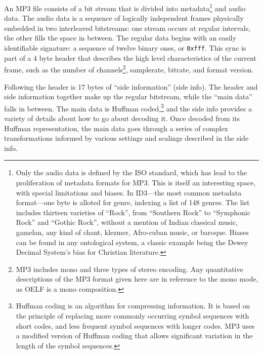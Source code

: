 \documentclass{thesis}
\begin{document}
	An MP3 file consists of a bit stream that is divided into metadata\footnote{Only the audio data is defined by the ISO standard, which has lead to the proliferation of metadata formats for MP3. This is itself an interesting space, with special limitations and biases. In ID3---the most common metadata format---one byte is alloted for genre, indexing a list of 148 genres. The list includes thirteen varieties of ``Rock'', from ``Southern Rock'' to ``Symphonic Rock'' and ``Gothic Rock'', without a mention of Indian classical music, gamelan, any kind of chant, klezmer, Afro-cuban music, or baroque. Biases can be found in any ontological system, a classic example being the Dewey Decimal System's bias for Christian literature.} and audio data. The audio data is a sequence of logically independent frames physically embedded in two interleaved bitstreams: one stream occurs at regular intervals, the other fills the space in between. The regular data begins with an easily identifiable signature: a sequence of twelve binary ones, or \verb!0xfff!. This sync is part of a 4 byte header that describes the high level characteristics of the current frame, such as the number of channels\footnote{MP3 includes mono and three types of stereo encoding. Any quantitative descriptions of the MP3 format given here are in reference to the mono mode, as OELF is a mono composition.}, samplerate, bitrate, and format version.
	
	Following the header is 17 bytes of ``side information'' (side info). The header and side information together make up the regular bitstream, while the ``main data'' falls in between. The main data is Huffman coded,\footnote{Huffman coding is an algorithm for compressing information. It is based on the principle of replacing more commonly occurring symbol sequences with short codes, and less frequent symbol sequences with longer codes. MP3 uses a modified version of Huffman coding that allows significant variation in the length of the symbol sequences.} and the side info provides a variety of details about how to go about decoding it. Once decoded from its Huffman representation, the main data goes through a series of complex transformations informed by various settings and scalings described in the side info.
	
\end{document}
